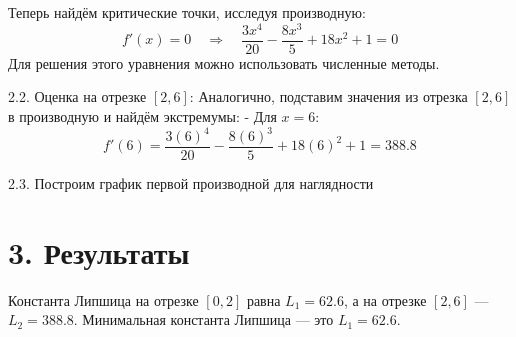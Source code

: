 \documentclass[a4paper,12pt]{article}
\begin{document}
Теперь найдём критические точки, исследуя производную:
\[
f'(x) = 0 \quad \Rightarrow \quad \frac{3x^4}{20} - \frac{8x^3}{5} + 18x^2 + 1 = 0
\]
Для решения этого уравнения можно использовать численные методы.

2.2. Оценка на отрезке \( [2, 6] \):
Аналогично, подставим значения из отрезка \( [2, 6] \) в производную и найдём экстремумы:
- Для \( x = 6 \):
\[
f'(6) = \frac{3(6)^4}{20} - \frac{8(6)^3}{5} + 18(6)^2 + 1 = 388.8
\]

2.3. Построим график первой производной для наглядности

\begin{center}
\end{center}

\section*{3. Результаты}

Константа Липшица на отрезке \( [0, 2] \) равна \( L_1 = 62.6 \), а на отрезке \( [2, 6] \) — \( L_2 = 388.8 \). Минимальная константа Липшица — это \( L_1 = 62.6 \).
\end{document}
